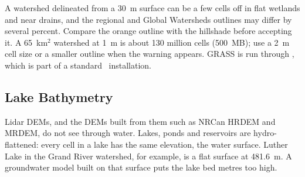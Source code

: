         A watershed delineated from a 30~m surface can be a few cells off in flat wetlands and near drains, and the regional and Global Watersheds outlines may differ by several percent.  Compare the orange outline with the hillshade before accepting it.  A 65~km$^2$ watershed at 1~m is about 130 million cells (500~MB); use a 2~m cell size or a smaller outline when the warning appears.  GRASS is run through , which is part of a standard \qgis\ installation.

    \subsection{Lake Bathymetry}
        \label{qgis:LakeBathymetry} 
        Lidar DEMs, and the DEMs built from them such as NRCan HRDEM and MRDEM, do not see through water.  Lakes, ponds and reservoirs are hydro-flattened: every cell in a lake has the same elevation, the water surface.  Luther Lake in the Grand River watershed, for example, is a flat surface at 481.6~m.  A groundwater model built on that surface puts the lake bed metres too high.

